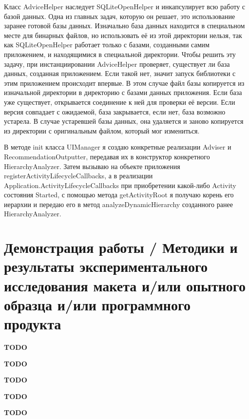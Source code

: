 \documentclass[a4paper,14pt]{extarticle} %
\begin{document}
	Класс AdviceHelper наследует SQLiteOpenHelper и инкапсулирует всю работу с базой данных. Одна из главных задач, которую он решает, это использование заранее готовой базы данных. Изначально база данных находится в специальном месте для бинарных файлов, но использовать её из этой директории нельзя, так как SQLiteOpenHelper работает только с базами, созданными самим приложением, и находящимися в специальной директории. Чтобы решить эту задачу, при инстанциировании AdviceHelper проверяет, существует ли база данных, созданная приложением. Если такой нет, значит запуск библиотеки с этим приложением происходит впервые. В этом случае файл базы копируется из изначальной директории в директорию с базами данных приложения. Если база уже существует, открывается соединение к ней для проверки её версии. Если версия совпадает с ожидаемой, база закрывается, если нет, база возможно устарела. В случае устаревшей базы данных, она удаляется и заново копируется из директории с оригинальным файлом, который мог измениться.
	
	В методе init класса UIManager я создаю конкретные реализации Adviser и RecommendationOutputter, передавая их в конструктор конкретного HierarchyAnalyzer. Затем вызываю на объекте приложения registerActivityLifecycleCallbacks, а в реализации Application.ActivityLifecycleCallbacks при приобретении какой-либо Activity состояния Started, с помощью метода getActivityRoot я получаю корень его иерархии и передаю его в метод analyzeDynamicHierarchy созданного ранее HierarchyAnalyzer.
	
	
	\newpage
	\section{Демонстрация работы / Методики и результаты экспериментального исследования макета и/или опытного образца и/или программного продукта}
	
	\textbf{\Huge TODO}
	
	\newpage
	
	\textbf{\Huge TODO}
	
	\newpage
	
	\textbf{\Huge TODO}

	\newpage
	
	\textbf{\Huge TODO}
	
	\newpage
	
	\printbibliography[heading=none]
	
	\newpage
	
	\textbf{\Huge TODO}
\end{document}
